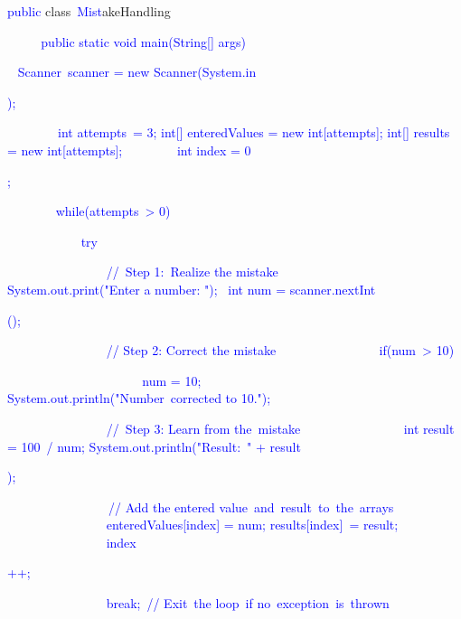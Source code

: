 \documentclass{article}
\begin{document}
\begin{tcolorbox}[colframe=black,colback=white]
{}\textcolor{blue}{public} class\textcolor{blue}{~Mist}akeHandling\textcolor{blue}{~{
}\textcolor{blue}{~~~} public static void main(String\textcolor{blue}{[]} args)\textcolor{blue}{~{
}        Scanner\textcolor{blue}{~scanner} = new Scanner(System.in\textcolor{blue}{);

}\textcolor{blue}{~~~~~~~}\textcolor{blue}{~int} attempts\textcolor{blue}{~=} \textcolor{blue}{3};
        int[] entered\textcolor{blue}{Values} = new int\textcolor{blue}{[at}tempts];
        int[] results = new int[attempts];
\textcolor{blue}{~~~~~~~}\textcolor{blue}{~int} index = 0\textcolor{blue}{;

}\textcolor{blue}{~~~~~~~} while(at\textcolor{blue}{tempts}\textcolor{blue}{~>} 0\textcolor{blue}{)} {
\textcolor{blue}{~~~~~~~~~~~} try {
\textcolor{blue}{~~~~~~~~~~~~~~~} //\textcolor{blue}{~Step} 1:\textcolor{blue}{~Real}ize the mistake
\textcolor{blue}{~~~~~~~~~~~~~~~} System.out.print("Enter a number: ");
               \textcolor{blue}{~int} num = scanner.nextInt\textcolor{blue}{();

}\textcolor{blue}{~~~~~~~~~~~~~~~} // Step 2: Correct the mistake
\textcolor{blue}{~~~~~~~~~~~~~~~} if\textcolor{blue}{(num}\textcolor{blue}{~>} \textcolor{blue}{10}\textcolor{blue}{)}\textcolor{blue}{~{
}\textcolor{blue}{~~~~~~~~~~~~~~~~~~~} num = 10;
\textcolor{blue}{~~~~~~~~~~~~~~~~~~~} System.out\textcolor{blue}{.println}("Number\textcolor{blue}{~corrected} to 10.");
               \textcolor{blue}{~}

}\textcolor{blue}{~~~~~~~~~~~~~~~} //\textcolor{blue}{~Step} 3: Learn from the\textcolor{blue}{~mistake}
\textcolor{blue}{~~~~~~~~~~~~~~~} int result = 100\textcolor{blue}{~/} num;
                System.out.println("Result:\textcolor{blue}{~"} + result\textcolor{blue}{);

}\textcolor{blue}{~~~~~~~~~~~~~~~}\textcolor{blue}{~//} Add the entered value\textcolor{blue}{~and}\textcolor{blue}{~result}\textcolor{blue}{~to}\textcolor{blue}{~the}\textcolor{blue}{~arrays}\textcolor{blue}{
}\textcolor{blue}{~~~~~~~~~~~~~~~} enteredValues\textcolor{blue}{[index}\textcolor{blue}{]} = num;
                results[index\textcolor{blue}{]}\textcolor{blue}{~=} result;
\textcolor{blue}{~~~~~~~~~~~~~~~} index\textcolor{blue}{++;

}\textcolor{blue}{~~~~~~~~~~~~~~~} break;\textcolor{blue}{~//} Exit\textcolor{blue}{~the} loop\textcolor{blue}{~if} no\textcolor{blue}{~exception}\textcolor{blue}{~is}\textcolor{blue}{~thrown}\textcolor{blue}{

}}}}}
\end{tcolorbox}
\end{document}
